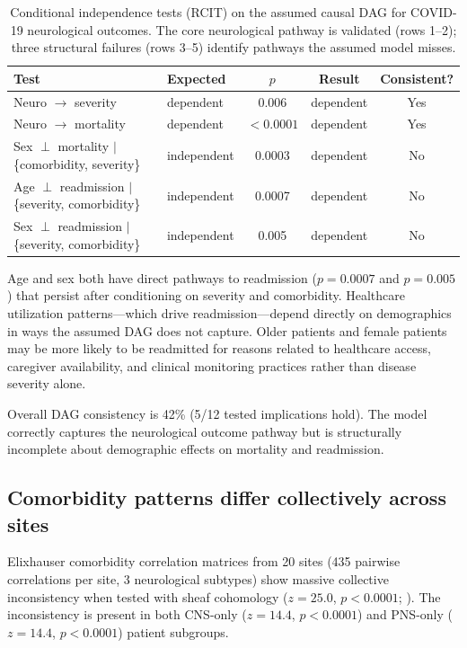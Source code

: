 \documentclass{article}
\begin{document}
\begin{table}[t]
\centering
\caption{Conditional independence tests (RCIT) on the assumed causal DAG for COVID-19 neurological outcomes. The core neurological pathway is validated (rows 1--2); three structural failures (rows 3--5) identify pathways the assumed model misses.}
\label{tab:rcit}
\begin{tabular}{llccc}
\toprule
Test & Expected & $p$ & Result & Consistent? \\
\midrule
Neuro $\to$ severity & dependent & 0.006 & dependent & Yes \\
Neuro $\to$ mortality & dependent & $< 0.0001$ & dependent & Yes \\
\midrule
Sex $\perp$ mortality $\mid$ \{comorbidity, severity\} & independent & 0.0003 & dependent & No \\
Age $\perp$ readmission $\mid$ \{severity, comorbidity\} & independent & 0.0007 & dependent & No \\
Sex $\perp$ readmission $\mid$ \{severity, comorbidity\} & independent & 0.005 & dependent & No \\
\bottomrule
\end{tabular}
\end{table}

Age and sex both have direct pathways to readmission ($p = 0.0007$ and $p = 0.005$) that persist after conditioning on severity and comorbidity. Healthcare utilization patterns---which drive readmission---depend directly on demographics in ways the assumed DAG does not capture. Older patients and female patients may be more likely to be readmitted for reasons related to healthcare access, caregiver availability, and clinical monitoring practices rather than disease severity alone.

Overall DAG consistency is 42\% (5/12 tested implications hold). The model correctly captures the neurological outcome pathway but is structurally incomplete about demographic effects on mortality and readmission.


\subsection{Comorbidity patterns differ collectively across sites}

Elixhauser comorbidity correlation matrices \cite{elixhauser1998} from 20 sites (435 pairwise correlations per site, 3 neurological subtypes) show massive collective inconsistency when tested with sheaf cohomology ($z = 25.0$, $p < 0.0001$; \citealt{robinson2017sheaf}). The inconsistency is present in both CNS-only ($z = 14.4$, $p < 0.0001$) and PNS-only ($z = 14.4$, $p < 0.0001$) patient subgroups.
\end{document}
